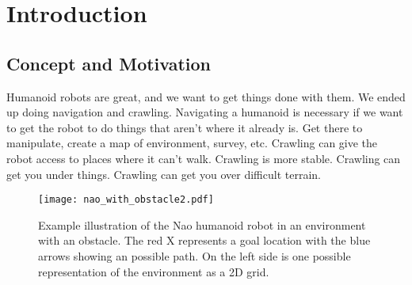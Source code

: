 \chapter{Introduction} \label{ch:introduction}

\section{Concept and Motivation}
Humanoid robots are great, and we want to get things done with them.
We ended up doing navigation and crawling.
Navigating a humanoid is necessary if we want to get the robot to do things
that aren't where it already is.
Get there to manipulate, create a map of environment, survey, etc.
Crawling can give the robot access to places where it can't walk.
Crawling is more stable.
Crawling can get you under things.
Crawling can get you over difficult terrain.

\begin{figure}[h!]
	\centering
    \texttt{[image: nao\_with\_obstacle2.pdf]}
	\caption{Example illustration of the Nao humanoid robot in an environment 
             with an obstacle. The red X represents a goal location with the 
             blue arrows showing an possible path. On the left side is one 
             possible representation of the environment as a 2D grid.}
	\label{fig:nao_with_obstacle2}
\end{figure}

